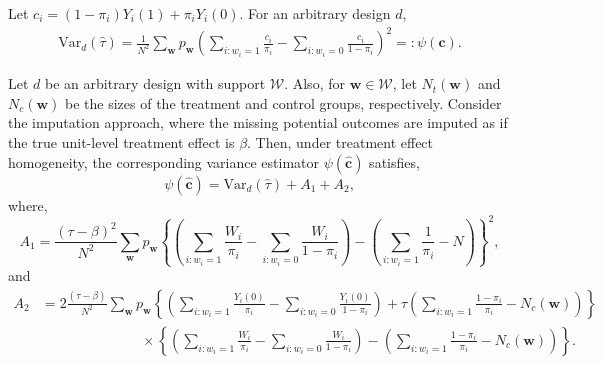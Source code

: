 \documentclass[10pt,a4paper]{amsart}
\newcommand{\Var}{{\text{Var}}}
\begin{document}
\begin{proposition} \normalfont
Let $c_i  = (1-\pi_i)Y_i(1) + \pi_i Y_i(0)$. For an arbitrary design $d$,
    \begin{align}
    \Var_d(\hat{\tau}) = \frac{1}{N^2}\sum_{\bm{w}} p_{\bm{w}} \left(\sum_{i:w_{i} = 1}\frac{c_{i}}{\pi_{i}} - \sum_{i:w_{i} = 0}\frac{c_{i}}{1-\pi_{i}} \right)^2 =: \psi(\bm{c}). 
\end{align}
\label{prop_impute_gen}
\end{proposition}

\begin{theorem} \normalfont
Let $d$ be an arbitrary design with support $\mathcal{W}$. Also, for $\bm{w} \in \mathcal{W}$, let $N_t(\bm{w})$ and $N_c(\bm{w})$ be the sizes of the treatment and control groups, respectively. 
Consider the imputation approach, where the missing potential outcomes are imputed as if the true unit-level treatment effect is $\beta$. Then, under treatment effect homogeneity, the corresponding variance estimator $\psi(\hat{\bm{c}})$ satisfies,
$$\psi(\hat{\bm{c}}) = \Var_d(\hat{\tau}) + A_1 + A_2,$$
where, 
$$A_1  = \frac{(\tau - \beta)^2}{N^2}\sum_{\bm{w}}p_{\bm{w}}\left\{\left(\sum_{i:w_i = 1}\frac{W_i}{\pi_i} - \sum_{i:w_i = 0}\frac{W_i}{1-\pi_i}\right) - \left(\sum_{i:w_i = 1}\frac{1}{\pi_i} - N \right)\right\}^2,$$
and 
\begin{align*}
  A_2 & =   2\frac{(\tau - \beta)}{N^2}\sum_{\bm{w}}p_{\bm{w}}\left\{ \left(\sum_{i:w_i = 1}\frac{Y_i(0)}{\pi_i} - \sum_{i:w_i = 0}\frac{Y_i(0)}{1-\pi_i} \right) + \tau \left( \sum_{i:w_i = 1}\frac{1-\pi_i}{\pi_i} - N_c(\bm{w}) \right) \right\} \nonumber \\
 & \hspace{3cm} \times \left\{\left(\sum_{i:w_i = 1}\frac{W_i}{\pi_i} - \sum_{i:w_i = 0}\frac{W_i}{1-\pi_i}\right) - \left(\sum_{i:w_i = 1}\frac{1-\pi_i}{\pi_i} - N_c(\bm{w}) \right)\right\}.
\end{align*} \label{thm_impute_general}
\end{theorem}
\end{document}
